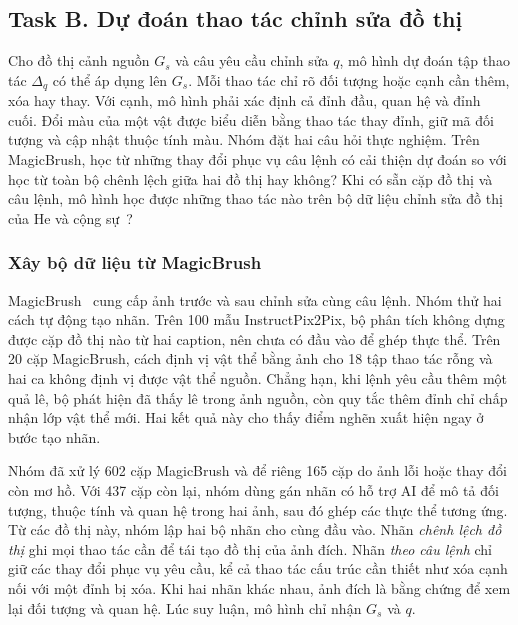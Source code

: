 \subsection{Task B. Dự đoán thao tác chỉnh sửa đồ thị}
Cho đồ thị cảnh nguồn $G_s$ và câu yêu cầu chỉnh sửa $q$, mô hình dự đoán tập
thao tác $\Delta_q$ có thể áp dụng lên $G_s$. Mỗi thao tác chỉ rõ đối tượng
hoặc cạnh cần thêm, xóa hay thay. Với cạnh, mô hình phải xác định cả đỉnh đầu,
quan hệ và đỉnh cuối. Đổi màu của một vật được biểu diễn bằng thao tác thay đỉnh,
giữ mã đối tượng và cập nhật thuộc tính màu. Nhóm đặt hai câu hỏi thực nghiệm.
Trên MagicBrush, học từ những thay đổi phục vụ câu lệnh có cải thiện dự đoán
so với học từ toàn bộ chênh lệch giữa hai đồ thị hay không? Khi có sẵn cặp đồ
thị và câu lệnh, mô hình học được những thao tác nào trên bộ dữ liệu chỉnh sửa đồ thị của He và cộng sự~\cite{he2020sgmod}?

\subsubsection{Xây bộ dữ liệu từ MagicBrush}
MagicBrush~\cite{zhang2023magicbrush} cung cấp ảnh trước và sau chỉnh sửa
cùng câu lệnh. Nhóm thử hai cách tự động tạo nhãn. Trên 100 mẫu
InstructPix2Pix, bộ phân tích không dựng được cặp đồ thị nào từ hai caption,
nên chưa có đầu vào để ghép thực thể. Trên 20 cặp MagicBrush, cách định vị
vật thể bằng ảnh cho 18 tập thao tác rỗng và hai ca không định vị được vật
thể nguồn. Chẳng hạn, khi lệnh yêu cầu thêm một quả lê, bộ phát hiện đã thấy
lê trong ảnh nguồn, còn quy tắc thêm đỉnh chỉ chấp nhận lớp vật thể mới.
Hai kết quả này cho thấy điểm nghẽn xuất hiện ngay ở bước tạo nhãn.

Nhóm đã xử lý 602 cặp MagicBrush và để riêng 165 cặp do ảnh lỗi hoặc thay đổi
còn mơ hồ. Với 437 cặp còn lại, nhóm dùng gán nhãn có hỗ trợ AI để mô tả đối tượng, thuộc tính
và quan hệ trong hai ảnh, sau đó ghép các thực thể tương ứng. Từ các đồ thị này, nhóm lập hai bộ nhãn cho cùng đầu vào. Nhãn \textit{chênh lệch đồ thị}
ghi mọi thao tác cần để tái tạo đồ thị của ảnh đích. Nhãn \textit{theo câu
lệnh} chỉ giữ các thay đổi phục vụ yêu cầu, kể cả thao tác cấu trúc cần thiết
như xóa cạnh nối với một đỉnh bị xóa. Khi hai nhãn khác nhau, ảnh đích là
bằng chứng để xem lại đối tượng và quan hệ. Lúc suy luận, mô hình chỉ nhận
$G_s$ và $q$.

